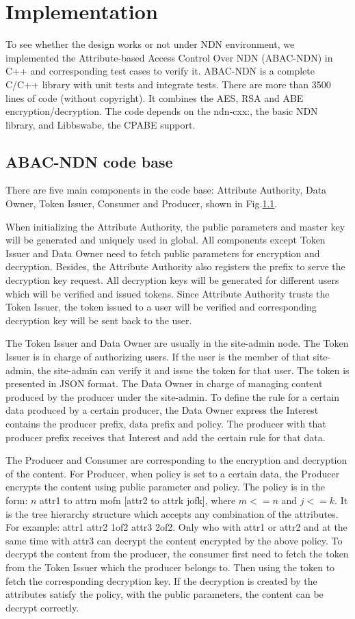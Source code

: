 \section{Implementation}

To see whether the design works or not under NDN environment, we implemented the Attribute-based Access Control Over NDN (ABAC-NDN) in C++ and corresponding test cases to verify it. ABAC-NDN is a complete C/C++ library with unit tests and integrate tests. There are more than 3500 lines of code (without copyright). It combines the AES, RSA and ABE encryption/decryption. The code depends on the ndn-cxx:, the basic NDN library, and Libbswabe, the CPABE support.

\subsection{ABAC-NDN code base}

There are five main components in the code base: Attribute Authority, Data Owner, Token Issuer, Consumer and Producer, shown in Fig.\ref{}.

When initializing the Attribute Authority, the public parameters and master key will be generated and uniquely used in global. All components except Token Issuer and Data Owner need to fetch public parameters for encryption and decryption. Besides, the Attribute Authority also registers the prefix to serve the decryption key request. All decryption keys will be generated for different users which will be verified and issued tokens. Since Attribute Authority trusts the Token Issuer, the token issued to a user will be verified and corresponding decryption key will be sent back to the user.

The Token Issuer and Data Owner are usually in the site-admin node. The Token Issuer is in charge of authorizing users. If the user is the member of that site-admin, the site-admin can verify it and issue the token for that user. The token is presented in JSON format. The Data Owner in charge of managing content produced by the producer under the site-admin. To define the rule for a certain data produced by a certain producer, the Data Owner express the Interest contains the producer prefix, data prefix and policy. The producer with that producer prefix receives that Interest and add the certain rule for that data.

The Producer and Consumer are corresponding to the encryption and decryption of the content. For Producer, when policy is set to a certain data, the Producer encrypts the content using public parameter and policy. The policy is in the form: $n$ attr1 to attrn mofn [attr2 to attrk jofk], where $m<=n$ and $j<=k$. It is the tree hierarchy structure which accepts any combination of the attributes. For example: attr1 attr2 1of2 attr3 2of2. Only who with attr1 or attr2 and at the same time with attr3 can decrypt the content encrypted by the above policy. To decrypt the content from the producer, the consumer first need to fetch the token from the Token Issuer which the producer belongs to. Then using the token to fetch the corresponding decryption key. If the decryption is created by the attributes satisfy the policy, with the public parameters, the content can be decrypt correctly.

